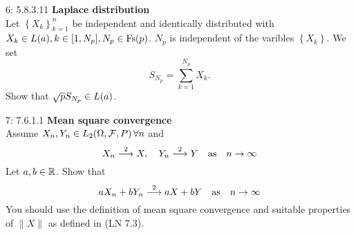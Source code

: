\documentclass[a4paper,twoside=false,abstract=false,numbers=noenddot,
titlepage=false,headings=small,parskip=half,version=last]{scrartcl}
\begin{document}
\begin{exercise}{6: 5.8.3.11} \textbf{Laplace distribution} \\
    Let $\left\{{X_k}\right\}_{k=1}^n$ be independent and identically
    distributed with
    ${X_k \in\text{$L$}(a),}\, {k\in[1,N_p],}\, {N_p\in \text{Fs}(p)}$.
    $N_p$ is independent of the varibles $\left\{X_k\right\}$. We set
    \begin{equation}
        S_{N_p} = \sum\limits_{k=1}^{N_p}X_k.
    \end{equation}
    Show that $\sqrt{p}S_{N_p}\in\text{$L$}(a)$.
\end{exercise}
\begin{solution}
\end{solution}
\pagebreak

\begin{exercise}{7: 7.6.1.1} \textbf{Mean square convergence}\\
    Assume $X_n, Y_n\in \text{$L_2$}(\Omega,\mathcal{F},P)\, \forall n$ and
    \begin{equation}
        X_n \stackrel{2}{\longrightarrow} X, \quad
        Y_n \stackrel{2}{\longrightarrow} Y \quad
        \text{as}\quad n\rightarrow\infty
    \end{equation}
    Let $a, b \in \mathbb{R}$. Show that
    \begin{equation}
        aX_n + bY_n\stackrel{2}{\longrightarrow} aX + bY\quad
        \text{as}\quad n\rightarrow\infty
    \end{equation}
    You should use the definition of mean square convergence and suitable
    properties of $\|X\|$ as defined in (LN 7.3).
\end{exercise}
\begin{solution}
\end{solution}
\pagebreak

\end{document}
